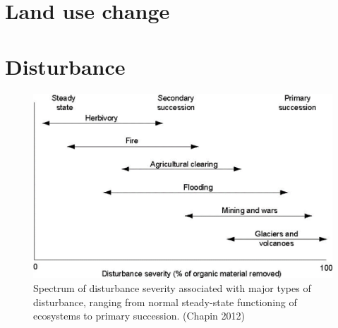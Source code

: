 \documentclass[12pt,oneside]{book}
\begin{document}
\section{Land use change}\label{land-use-change}

\section{Disturbance}\label{disturbance}

\begin{figure}

{\centering \includegraphics[width=0.8\linewidth]{figures/chap8/f83_disturbance_chapin} 

}

\caption{Spectrum of disturbance severity associated with major types of disturbance, ranging from normal steady-state functioning of ecosystems to primary succession. (Chapin 2012)}\label{fig:f83}
\end{figure}
\end{document}
